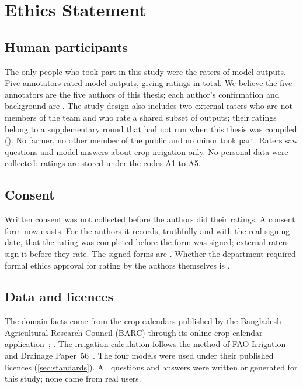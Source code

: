 \section*{Ethics Statement}

\subsection*{Human participants}
The only people who took part in this study were the raters of model outputs. Five annotators rated \HumUniqueOutputs model outputs, giving \HumJudgments ratings in total. We believe the five annotators are the five authors of this thesis; each author's confirmation and background are . The study design also includes two external raters who are not members of the team and who rate a shared subset of \HumOverlapOutputs outputs; their ratings belong to a supplementary round that had not run when this thesis was compiled (). No farmer, no other member of the public and no minor took part. Raters saw questions and model answers about crop irrigation only. No personal data were collected: ratings are stored under the codes A1 to A5.

\subsection*{Consent}
Written consent was not collected before the authors did their ratings. A consent form now exists. For the authors it records, truthfully and with the real signing date, that the rating was completed before the form was signed; external raters sign it before they rate. The signed forms are \PENDINGCONSENT{}. Whether the department required formal ethics approval for rating by the authors themselves is .

\subsection*{Data and licences}
The domain facts come from the crop calendars published by the Bangladesh Agricultural Research Council (BARC) through its online crop-calendar application~\cite{barc2026cropcalendar}; . The irrigation calculation follows the method of FAO Irrigation and Drainage Paper~56~\cite{allen1998fao56}. The four models were used under their published licences (\cref{sec:standards}). All questions and answers were written or generated for this study; none came from real users.

